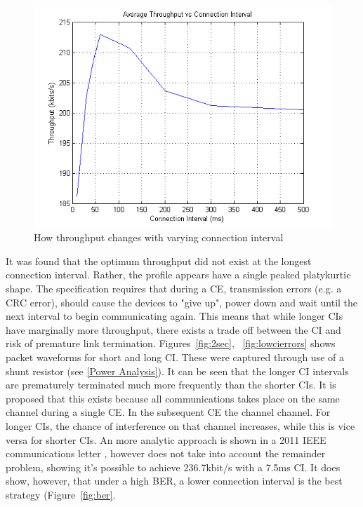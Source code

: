 \documentclass[]{article}
\begin{document}
\begin{figure}[H]
	\begin{center}
		\includegraphics[width = \textwidth]{civsdatarate}
	\end{center}
	\caption{How throughput changes with varying connection interval}
	\label{fig:civsdatarate}
\end{figure}

It was found that the optimum throughput did not exist at the longest connection interval. Rather, the profile appears have a single peaked platykurtic shape. The specification requires that during a \ac{CE}, transmission errors (e.g. a CRC error), should cause the devices to "give up", power down and wait until the next interval to begin communicating again. This means that while longer \ac{CI}s have marginally more throughput,  there exists a trade off between the \ac{CI} and risk of premature link termination. Figures~\ref{fig:2sec}, ~\ref{fig:lowcierrors} shows packet waveforms for short and long \ac{CI}. These were captured through use of a shunt resistor (see \ref{Power Analysis}). It can be seen that the longer \ac{CI} intervals are prematurely terminated much more frequently than the shorter \ac{CI}s. It is proposed that this exists because all communications takes place on the same channel during a single \ac{CE}. In the subsequent \ac{CE} the channel channel. For longer \ac{CI}s, the chance of interference on that channel increases, while this is vice versa for shorter \ac{CI}s. An more analytic approach is shown in a 2011 IEEE communications letter \cite{Gomez2011}, however does not take into account the remainder problem, showing it's possible to achieve 236.7kbit/s with a 7.5ms \ac{CI}. It does show, however, that under a high \ac{BER}, a lower connection interval is the best strategy (Figure~\ref{fig:ber}.
\end{document}
